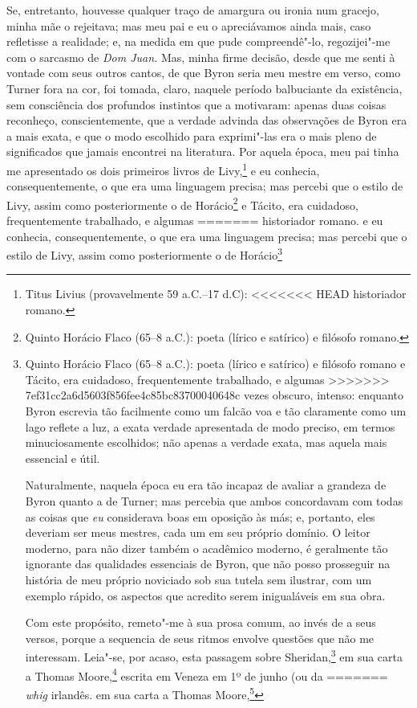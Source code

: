 {{{{{{{{{{{{{{{{{{{{{{{{{{{{{{{{{{{{{{{{{{{%
Se, entretanto, houvesse qualquer traço de amargura ou ironia num
gracejo, minha mãe o rejeitava; mas meu pai e eu o apreciávamos ainda
mais, caso refletisse a realidade; e, na medida em que pude
compreendê"-lo, regozijei"-me com o sarcasmo de \textit{Dom Juan.} Mas,
minha firme decisão, desde que me senti à vontade com seus outros
cantos, de que Byron seria meu mestre em verso, como Turner fora na cor,
foi tomada, claro, naquele período balbuciante da existência, sem
consciência dos profundos instintos que a motivaram: apenas duas coisas
reconheço, conscientemente, que a verdade advinda das observações de
Byron era a mais exata, e que o modo escolhido para exprimi"-las era o
mais pleno de significados que jamais encontrei na literatura. Por
aquela época, meu pai tinha me apresentado os dois primeiros livros de
Livy,\footnote{Titus Livius (provavelmente 59 a.C.--17 d.C):
<<<<<<< HEAD
  historiador romano.} e eu conhecia, consequentemente,
o que era uma linguagem precisa; mas percebi que o estilo de Livy, assim
como posteriormente o de Horácio\footnote{Quinto Horácio Flaco (65--8 a.C.): poeta (lírico e satírico) e filósofo romano.} e Tácito, era cuidadoso, frequentemente trabalhado, e algumas
=======
  historiador romano.  e eu conhecia, consequentemente,
o que era uma linguagem precisa; mas percebi que o estilo de Livy, assim
como posteriormente o de Horácio\footnote{Quinto Horácio Flaco (65--8 a.C.): poeta (lírico e satírico) e filósofo romano  e Tácito, era cuidadoso, frequentemente trabalhado, e algumas
>>>>>>> 7ef31cc2a6d5603f856fee4c85bc83700040648c
vezes obscuro, intenso: enquanto Byron escrevia tão facilmente como um
falcão voa e tão claramente como um lago reflete a luz, a exata verdade
apresentada de modo preciso, em termos minuciosamente escolhidos; não
apenas a verdade exata, mas aquela mais essencial e útil.

Naturalmente, naquela época eu era tão incapaz de avaliar a
grandeza de Byron quanto a de Turner; mas percebia que ambos concordavam
com todas as coisas que \textit{eu} considerava boas em oposição às más;
e, portanto, eles deveriam ser meus mestres, cada um em seu próprio
domínio. O leitor moderno, para não dizer também o acadêmico moderno, é
geralmente tão ignorante das qualidades essenciais de Byron, que não
posso prosseguir na história de meu próprio noviciado sob sua tutela sem
ilustrar, com um exemplo rápido, os aspectos que acredito serem
inigualáveis em sua obra.

Com este propósito, remeto"-me à sua prosa comum, ao invés de a seus
versos, porque a sequencia de seus ritmos envolve questões que não me
interessam. Leia"-se, por acaso, esta passagem sobre Sheridan,\footnote{Certamente
  Richard Brinsley Sheridan (1751--1816): dramaturgo e político
<<<<<<< HEAD
  \textit{whig} irlandês.} em sua carta a Thomas
Moore,\footnote{Thomas Moore (1779--1852): poeta, compositor e cantor
  irlandês.} escrita em Veneza em 1º de junho (ou da
=======
  \textit{whig} irlandês.  em sua carta a Thomas
Moore,\footnote{Thomas Moore (1779--1852): poeta, compositor e cantor
  irlandês.  escrita em Veneza em 1º de junho (ou da
>>>>>>> 7ef31cc2a6d5603f856fee4c85bc83700040648c
madrugada de 2 de junho!) de 1818: %

}}}}}}}}}}}}}}}}}}}}}}}}}}}}}}}}}}}}}}}}}}}}}
